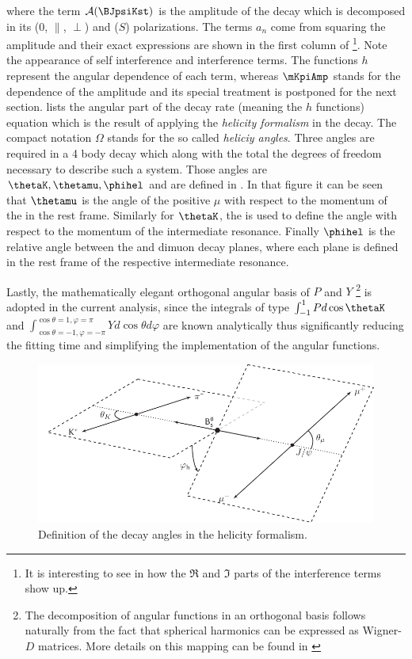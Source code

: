 \noindent where the term $\mathcal{A}(\text{\BJpsiKst})$ is the amplitude of the decay which is decomposed in its \pwave ($0$, $\parallel$, $\perp$) and \swave ($S$) polarizations.
The terms $a_n$ come from squaring the amplitude and their exact expressions are shown in the first column of
\footnote{It is interesting to see in \cite{jeroenThesis} how the $\Re$ and $\Im$ parts of the interference terms show up.}.
Note the appearance of \pwave self interference and \spwave interference terms. The functions $h$ represent the angular dependence of each term, whereas $\mKpiAmp$ stands
for the \mkpi dependence of the amplitude and its special treatment is postponed for the next section.  lists the angular part of the decay rate
(meaning the $h$ functions) equation which is the result of applying the \emph{helicity formalism} in the \BJpsiKst decay. The compact
notation $\Omega$ stands for the so called \emph{heliciy angles}. Three angles are required in a 4 body decay which along with the \mkpi
total the degrees of freedom necessary to describe such a system. Those angles are $\thetaK,\thetamu,\phihel$ and are defined in .
In that figure it can be seen that $\thetamu$ is the angle of the positive $\mu$ with respect to the momentum of the \Jpsi in the \Bs rest frame.
Similarly for $\thetaK$, the \kaon is used to define the angle with respect to the momentum of the intermediate \Kpi resonance. Finally $\phihel$ is
the relative angle between the \Kpi and dimuon decay planes, where each plane is defined in the rest frame of the respective intermediate resonance.

Lastly, the mathematically elegant orthogonal angular basis of $P$ and $Y$
\footnote{The decomposition of angular functions in an orthogonal basis follows naturally from the fact that spherical harmonics can be expressed as
Wigner-$D$ matrices. More details on this mapping can be found in \cite{jeroenThesis} }
is adopted in the current analysis, since the integrals of type $\int_{-1}^{1}Pd\cos\thetaK$ and $\int_{\cos\theta=-1,\varphi=-\pi}^{\cos\theta=1,\varphi=\pi}Yd\cos\theta d\varphi$ are known
analytically thus significantly reducing the fitting time and simplifying the implementation of the angular functions.

\begin{figure}[h]
\begin{center}
  \includegraphics[width=\textwidth]{Figures/Chapter4/helAngles.pdf}
  \caption{Definition of the decay angles in the helicity formalism.}
  \label{helAngles}
\end{center}
\end{figure}

